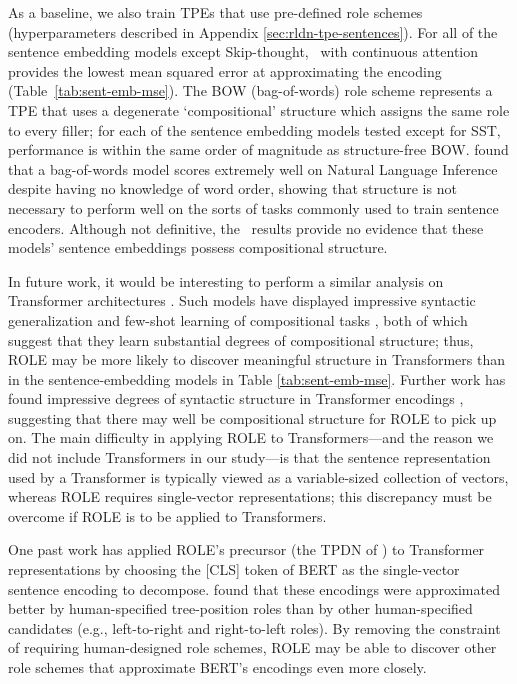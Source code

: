 As a baseline, we also train TPEs that use pre-defined role schemes (hyperparameters described in Appendix \ref{sec:rldn-tpe-sentences}). For all of the sentence embedding models except Skip-thought, \RLN\ with continuous attention provides the lowest mean squared error at approximating the encoding (Table~\ref{tab:sent-emb-mse}). The BOW (bag-of-words) role scheme represents a TPE that uses a degenerate `compositional' structure which assigns the same role to every filler; for each of the sentence embedding models tested except for SST, performance is  within the same order of magnitude as structure-free BOW. \citet{parikh2016decomposable} found that a bag-of-words model scores extremely well on Natural Language Inference despite having no knowledge of word order, showing that structure is not necessary to perform well on the sorts of tasks commonly used to train sentence encoders. Although not definitive, the \RLN\ results provide no evidence that these models' sentence embeddings possess compositional structure.

In future work, it would be interesting to perform a similar analysis on Transformer architectures \citep{vaswani2017attention}. Such models have displayed impressive syntactic generalization \cite{hu2020systematic} and few-shot learning of compositional tasks \cite{brown2020language}, both of which suggest that they learn substantial degrees of compositional structure; thus, ROLE may be more likely to discover meaningful structure in Transformers than in the sentence-embedding models in Table \ref{tab:sent-emb-mse}. Further work has found impressive degrees of syntactic structure in Transformer encodings \cite{hewitt2019structural}, suggesting that there may well be compositional structure for ROLE to pick up on. The main difficulty in applying ROLE to Transformers---and the reason we did not include Transformers in our study---is that the sentence representation used by a Transformer is typically viewed as a variable-sized collection of vectors, whereas ROLE requires single-vector representations; this discrepancy must be overcome if ROLE is to be applied to Transformers. 

One past work \cite{jawahar-etal-2019-bert} has applied ROLE's precursor (the TPDN of \citet{mccoy}) to Transformer representations by choosing the [CLS] token of BERT \cite{devlin2019bert} as the single-vector sentence encoding to decompose. \citeauthor{jawahar-etal-2019-bert} found that these encodings were approximated better by human-specified tree-position roles than by other human-specified candidates (e.g., left-to-right and right-to-left roles). By removing the constraint of requiring human-designed role schemes, ROLE may be able to discover other role schemes that approximate BERT's encodings even more closely.

